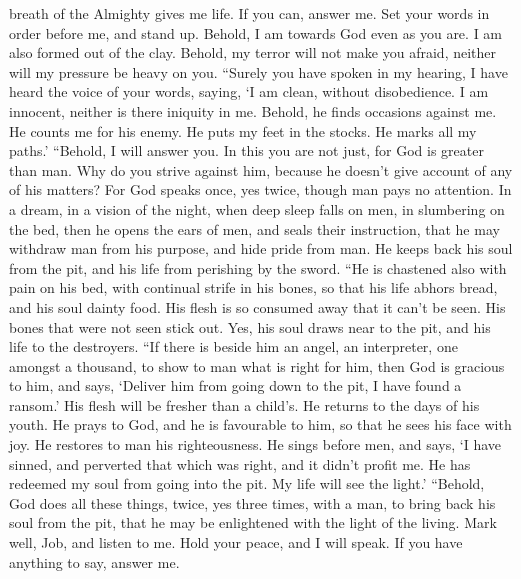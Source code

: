 breath of the Almighty gives me life.  If you can, answer
me. Set your words in order before me, and stand up. 
Behold, I am towards God even as you are. I am also formed out of the
clay.  Behold, my terror will not make you afraid, neither
will my pressure be heavy on you.  ``Surely you have spoken
in my hearing, I have heard the voice of your words, saying,
 `I am clean, without disobedience. I am innocent, neither
is there iniquity in me.  Behold, he finds occasions
against me. He counts me for his enemy.  He puts my feet in
the stocks. He marks all my paths.'  ``Behold, I will
answer you. In this you are not just, for God is greater than man.
 Why do you strive against him, because he doesn't give
account of any of his matters?  For God speaks once, yes
twice, though man pays no attention.  In a dream, in a
vision of the night, when deep sleep falls on men, in slumbering on the
bed,  then he opens the ears of men, and seals their
instruction,  that he may withdraw man from his purpose,
and hide pride from man.  He keeps back his soul from the
pit, and his life from perishing by the sword.  ``He is
chastened also with pain on his bed, with continual strife in his bones,
 so that his life abhors bread, and his soul dainty food.
 His flesh is so consumed away that it can't be seen. His
bones that were not seen stick out.  Yes, his soul draws
near to the pit, and his life to the destroyers.  ``If
there is beside him an angel, an interpreter, one amongst a thousand, to
show to man what is right for him,  then God is gracious to
him, and says, `Deliver him from going down to the pit, I have found a
ransom.'  His flesh will be fresher than a child's. He
returns to the days of his youth.  He prays to God, and he
is favourable to him, so that he sees his face with joy. He restores to
man his righteousness.  He sings before men, and says, `I
have sinned, and perverted that which was right, and it didn't profit
me.  He has redeemed my soul from going into the pit. My
life will see the light.'  ``Behold, God does all these
things, twice, yes three times, with a man,  to bring back
his soul from the pit, that he may be enlightened with the light of the
living.  Mark well, Job, and listen to me. Hold your peace,
and I will speak.  If you have anything to say, answer me.
